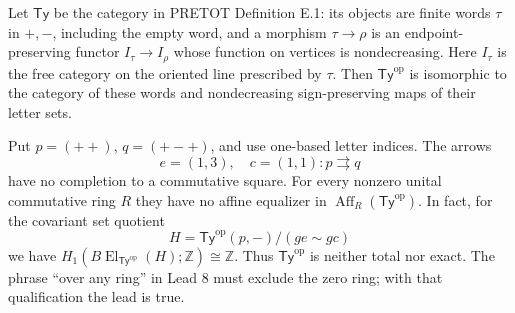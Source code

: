 \begin{proposition}\label{FT:ty}
Let $\mathsf{Ty}$ be the category in PRETOT Definition E.1: its objects
are finite words $\tau$ in $+,-$, including the empty word, and a morphism
$\tau\to\rho$ is an endpoint-preserving functor
$I_\tau\to I_\rho$ whose function on vertices is nondecreasing. Here
$I_\tau$ is the free category on the oriented line prescribed by $\tau$.
Then $\mathsf{Ty}^{\mathrm{op}}$ is isomorphic to the category of these
words and nondecreasing sign-preserving maps of their letter sets.

Put $p=(++)$, $q=(+-+)$, and use one-based letter indices. The arrows
\[
 e=(1,3),\quad c=(1,1):p\rightrightarrows q
\]
have no completion to a commutative square. For every nonzero unital
commutative ring $R$ they have no affine equalizer in
$\operatorname{Aff}_R(\mathsf{Ty}^{\mathrm{op}})$.
In fact, for the covariant set quotient
\[
 H=\mathsf{Ty}^{\mathrm{op}}(p,-)/(ge\sim gc)
\]
we have
$H_1(B\operatorname{El}_{\mathsf{Ty}^{\mathrm{op}}}(H);\mathbb Z)
\cong\mathbb Z$. Thus $\mathsf{Ty}^{\mathrm{op}}$ is neither total nor
exact. The phrase ``over any ring'' in Lead 8 must exclude the zero ring;
with that qualification the lead is true.
\end{proposition}
